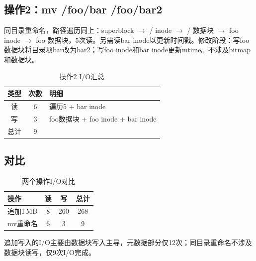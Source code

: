 \documentclass[fleqn]{ctexart}
\begin{document}
\subsection*{操作2：mv /foo/bar /foo/bar2}

同目录重命名，路径遍历同上：superblock $\to$ / inode $\to$ / 数据块 $\to$ foo inode $\to$ foo 数据块，5次读。另需读bar inode以更新时间戳。修改阶段：写foo数据块将目录项bar改为bar2；写foo inode和bar inode更新mtime。不涉及bitmap和数据块。

\begin{table}[H]
\centering
\caption{操作2 I/O汇总}
\begin{tabular}{c|c|l}
\hline
类型 & 次数 & 明细 \\
\hline
读 & 6 & 遍历5 + bar inode \\
写 & 3 & foo数据块 + foo inode + bar inode \\
\hline
总计 & 9 & \\
\hline
\end{tabular}
\end{table}

\subsection*{对比}

\begin{table}[H]
\centering
\caption{两个操作I/O对比}
\begin{tabular}{l|c|c|c}
\hline
操作 & 读 & 写 & 总计 \\
\hline
追加1\,MB & 8 & 260 & 268 \\
mv重命名 & 6 & 3 & 9 \\
\hline
\end{tabular}
\end{table}

追加写入的I/O主要由数据块写入主导，元数据部分仅12次；同目录重命名不涉及数据块读写，仅9次I/O完成。
\end{document}
